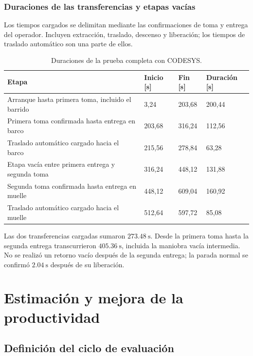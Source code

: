 \documentclass[a4paper,10pt,onecolumn,journal]{ieeeconf}
\numberwithin{equation}{section}
\begin{document}

\subsubsection{Duraciones de las transferencias y etapas vacías}
Los tiempos cargados se delimitan mediante las confirmaciones de toma y entrega del operador. Incluyen extracción, traslado, descenso y liberación; los tiempos de traslado automático son una parte de ellos.

\begin{table}[H]\centering\small
\caption{Duraciones de la prueba completa con CODESYS.}
\label{tab:duraciones_completa_codesys}
\begin{tabular}{L{.44\textwidth}C{.15\textwidth}C{.15\textwidth}C{.11\textwidth}}\toprule
Etapa & Inicio [s] & Fin [s] & Duración [s]\\\midrule
Arranque hasta primera toma, incluido el barrido & 3,24 & 203,68 & 200,44\\
Primera toma confirmada hasta entrega en barco & 203,68 & 316,24 & 112,56\\
Traslado automático cargado hacia el barco & 215,56 & 278,84 & 63,28\\
Etapa vacía entre primera entrega y segunda toma & 316,24 & 448,12 & 131,88\\
Segunda toma confirmada hasta entrega en muelle & 448,12 & 609,04 & 160,92\\
Traslado automático cargado hacia el muelle & 512,64 & 597,72 & 85,08\\\bottomrule
\end{tabular}\end{table}

Las dos transferencias cargadas sumaron $273.48~\mathrm{s}$. Desde la primera toma hasta la segunda entrega transcurrieron $405.36~\mathrm{s}$, incluida la maniobra vacía intermedia. No se realizó un retorno vacío después de la segunda entrega; la parada normal se confirmó $2.04~\mathrm{s}$ después de su liberación.


\par
{}
\section{Estimación y mejora de la productividad}
\label{sec:estimacion_productividad}

\subsection{Definición del ciclo de evaluación}
\end{document}

